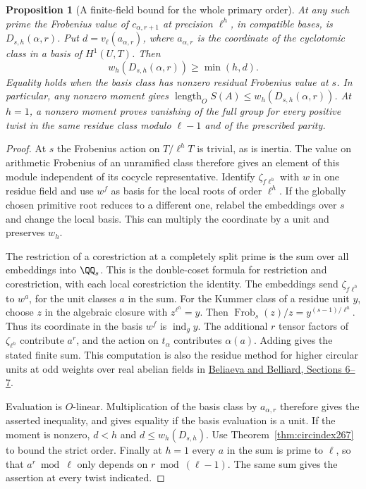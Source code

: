 \documentclass[a4paper,11pt]{article}
\newtheorem{proposition}{Proposition}[section]
\theoremstyle{definition}
\theoremstyle{remark}
\numberwithin{equation}{section}
\begin{document}
\begin{proposition}[A finite-field bound for the whole primary order]\leavevmode
\label{prop:moment267}
At any such prime the Frobenius value of \(c_{\alpha,r+1}\)
at precision \(\ell^h\), in compatible bases, is
\(D_{s,h}(\alpha,r)\). Put \(d=v_\ell(a_{\alpha,r})\),
where \(a_{\alpha,r}\) is the coordinate of the cyclotomic
class in a basis of \(H^1(U,T)\). Then
\[
  w_h(D_{s,h}(\alpha,r))\ge\min(h,d).
\]
Equality holds when the basis class has nonzero residual
Frobenius value at \(s\). In particular, any nonzero moment
gives \(\operatorname{length}_O S(A)\le w_h(D_{s,h}(\alpha,r))\).
At \(h=1\), a nonzero moment proves vanishing of the full
group for every positive twist in the same residue class
modulo \(\ell-1\) and of the prescribed parity.
\end{proposition}
\begin{proof}
At \(s\) the Frobenius action on \(T/\ell^hT\) is trivial,
as is inertia. The value on arithmetic Frobenius of an
unramified class therefore gives an element of this module
independent of its cocycle representative. Identify
\(\zeta_{f\ell^h}\) with \(w\) in one residue field and use
\(w^f\) as basis for the local roots of order \(\ell^h\).
If the globally chosen primitive root reduces to a different
one, relabel the embeddings over \(s\) and change the local
basis. This can multiply the coordinate by a unit and preserves
\(w_h\).

The restriction of a corestriction at a completely split
prime is the sum over all embeddings into \(\QQ_s\).
This is the double-coset formula for restriction and
corestriction, with each local corestriction the identity.
The embeddings send \(\zeta_{f\ell^h}\) to \(w^a\), for the
unit classes \(a\) in the sum. For the Kummer class of a
residue unit \(y\), choose \(z\) in the algebraic closure
with \(z^{\ell^h}=y\). Then
\(\operatorname{Frob}_s(z)/z=y^{(s-1)/\ell^h}\).
Thus its coordinate in the basis \(w^f\) is
\(\operatorname{ind}_g y\). The additional \(r\) tensor
factors of \(\zeta_{\ell^h}\) contribute \(a^r\), and the
action on \(t_\alpha\) contributes \(\alpha(a)\).
Adding gives the stated finite sum. This computation is also
the residue method for higher circular units at odd weights
over real abelian fields in
\href{https://arxiv.org/pdf/0912.0819\#page=19}{Beliaeva and
Belliard, Sections 6--7}.

Evaluation is \(O\)-linear. Multiplication of the basis class
by \(a_{\alpha,r}\) therefore gives the asserted inequality,
and gives equality if the basis evaluation is a unit.
If the moment is nonzero, \(d<h\) and
\(d\le w_h(D_{s,h})\). Use Theorem~\ref{thm:circindex267} to
bound the strict order. Finally at \(h=1\) every \(a\) in
the sum is prime to \(\ell\), so that \(a^r\bmod\ell\) only
depends on \(r\bmod(\ell-1)\). The same sum gives the
assertion at every twist indicated.
\end{proof}
\end{document}
